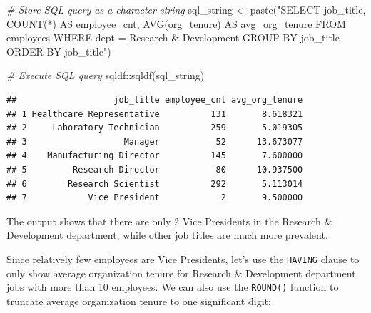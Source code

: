 \documentclass[
]{book}
\newenvironment{Shaded}{\begin{snugshade}}{\end{snugshade}}
\newcommand{\CommentTok}[1]{\textcolor[rgb]{0.56,0.35,0.01}{\textit{#1}}}
\newcommand{\FunctionTok}[1]{\textcolor[rgb]{0.00,0.00,0.00}{#1}}
\newcommand{\NormalTok}[1]{#1}
\newcommand{\OtherTok}[1]{\textcolor[rgb]{0.56,0.35,0.01}{#1}}
\newcommand{\SpecialCharTok}[1]{\textcolor[rgb]{0.00,0.00,0.00}{#1}}
\newcommand{\StringTok}[1]{\textcolor[rgb]{0.31,0.60,0.02}{#1}}
\begin{document}
\begin{Shaded}
\begin{Highlighting}[]
\CommentTok{\# Store SQL query as a character string}
\NormalTok{sql\_string }\OtherTok{\textless{}{-}} \FunctionTok{paste}\NormalTok{(}\StringTok{"SELECT}
\StringTok{                      job\_title,}
\StringTok{                      COUNT(*) AS employee\_cnt,}
\StringTok{                      AVG(org\_tenure) AS avg\_org\_tenure}
\StringTok{                    FROM}
\StringTok{                      employees}
\StringTok{                    WHERE}
\StringTok{                      dept = \textquotesingle{}Research \& Development\textquotesingle{}}
\StringTok{                    GROUP BY}
\StringTok{                      job\_title}
\StringTok{                    ORDER BY}
\StringTok{                      job\_title"}\NormalTok{)}

\CommentTok{\# Execute SQL query}
\NormalTok{sqldf}\SpecialCharTok{::}\FunctionTok{sqldf}\NormalTok{(sql\_string)}
\end{Highlighting}
\end{Shaded}

\begin{verbatim}
##                   job_title employee_cnt avg_org_tenure
## 1 Healthcare Representative          131       8.618321
## 2     Laboratory Technician          259       5.019305
## 3                   Manager           52      13.673077
## 4    Manufacturing Director          145       7.600000
## 5         Research Director           80      10.937500
## 6        Research Scientist          292       5.113014
## 7            Vice President            2       9.500000
\end{verbatim}

The output shows that there are only 2 Vice Presidents in the Research \& Development department, while other job titles are much more prevalent.

Since relatively few employees are Vice Presidents, let's use the \texttt{HAVING} clause to only show average organization tenure for Research \& Development department jobs with more than 10 employees. We can also use the \texttt{ROUND()} function to truncate average organization tenure to one significant digit:
\end{document}
